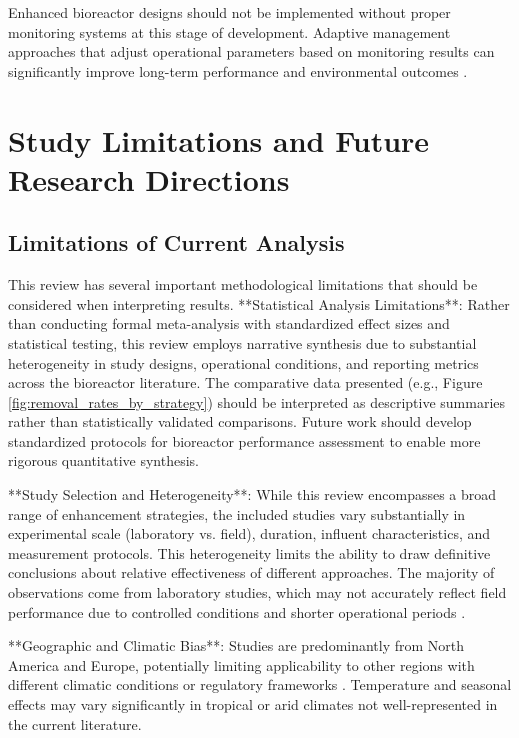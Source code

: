 \documentclass[12pt,a4paper]{article}
\begin{document}
Enhanced bioreactor designs should not be implemented without proper monitoring systems at this stage of development. Adaptive management approaches that adjust operational parameters based on monitoring results can significantly improve long-term performance and environmental outcomes \citep{RN310}.

\section{Study Limitations and Future Research Directions}

\subsection{Limitations of Current Analysis}

This review has several important methodological limitations that should be considered when interpreting results. **Statistical Analysis Limitations**: Rather than conducting formal meta-analysis with standardized effect sizes and statistical testing, this review employs narrative synthesis due to substantial heterogeneity in study designs, operational conditions, and reporting metrics across the bioreactor literature. The comparative data presented (e.g., Figure \ref{fig:removal_rates_by_strategy}) should be interpreted as descriptive summaries rather than statistically validated comparisons. Future work should develop standardized protocols for bioreactor performance assessment to enable more rigorous quantitative synthesis.

**Study Selection and Heterogeneity**: While this review encompasses a broad range of enhancement strategies, the included studies vary substantially in experimental scale (laboratory vs. field), duration, influent characteristics, and measurement protocols. This heterogeneity limits the ability to draw definitive conclusions about relative effectiveness of different approaches. The majority of observations come from laboratory studies, which may not accurately reflect field performance due to controlled conditions and shorter operational periods \citep{RN312}.

**Geographic and Climatic Bias**: Studies are predominantly from North America and Europe, potentially limiting applicability to other regions with different climatic conditions or regulatory frameworks \citep{RN1023, RN258}. Temperature and seasonal effects may vary significantly in tropical or arid climates not well-represented in the current literature.
\end{document}
